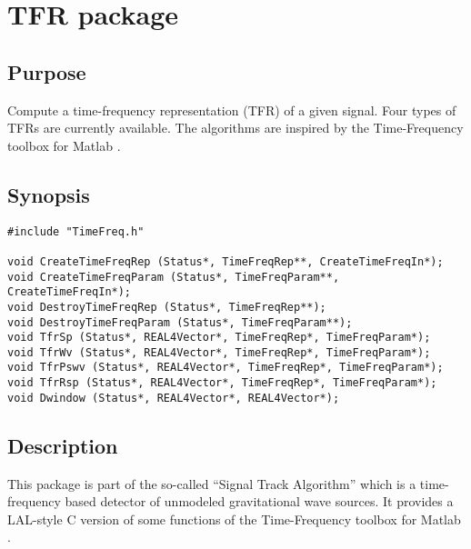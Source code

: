 \documentclass{article}
\begin{document}
\section{TFR package}

\subsection{Purpose}
Compute a time-frequency representation (TFR) of a given signal. Four
types of TFRs are currently available. The algorithms are inspired by
the Time-Frequency toolbox for Matlab \cite{tftb}.

\subsection{Synopsis}


\begin{verbatim}
#include "TimeFreq.h"

void CreateTimeFreqRep (Status*, TimeFreqRep**, CreateTimeFreqIn*);
void CreateTimeFreqParam (Status*, TimeFreqParam**, CreateTimeFreqIn*);
void DestroyTimeFreqRep (Status*, TimeFreqRep**);
void DestroyTimeFreqParam (Status*, TimeFreqParam**);
void TfrSp (Status*, REAL4Vector*, TimeFreqRep*, TimeFreqParam*);
void TfrWv (Status*, REAL4Vector*, TimeFreqRep*, TimeFreqParam*);
void TfrPswv (Status*, REAL4Vector*, TimeFreqRep*, TimeFreqParam*);
void TfrRsp (Status*, REAL4Vector*, TimeFreqRep*, TimeFreqParam*);
void Dwindow (Status*, REAL4Vector*, REAL4Vector*);
\end{verbatim}

\subsection{Description}
This package is part of the so-called ``Signal Track Algorithm'' which
is a time-frequency based detector of unmodeled gravitational wave
sources. It provides a LAL-style C version of some functions of the
Time-Frequency toolbox for Matlab \cite{tftb}.
\end{document}
